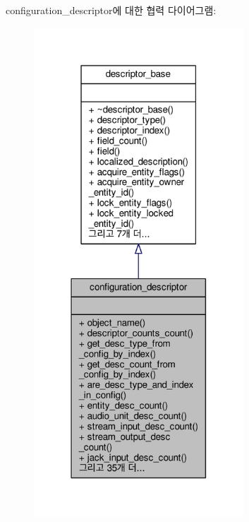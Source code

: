 configuration\+\_\+descriptor에 대한 협력 다이어그램\+:
\nopagebreak
\begin{figure}[H]
\begin{center}
\leavevmode
\includegraphics[width=223pt]{classavdecc__lib_1_1configuration__descriptor__coll__graph}
\end{center}
\end{figure}
